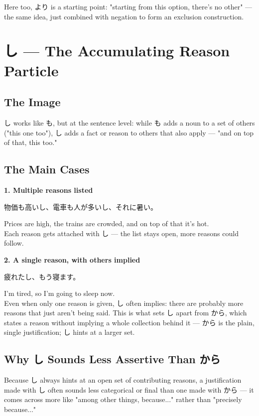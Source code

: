 \documentclass[12pt]{book}
\begin{document}
Here too, より is a starting point: "starting from this option, there's no other" — the same idea, just combined with negation to form an exclusion construction.


\chapter{し — The Accumulating Reason Particle}

\section*{The Image}

し works like も, but at the sentence level: while も adds a noun to a set of others ("this one too"), し adds a fact or reason to others that also apply — "and on top of that, this too."

\section*{The Main Cases}

\textbf{1. Multiple reasons listed}
\par\quad 物価も高いし、電車も人が多いし、それに暑い。\\
\par\quad Prices are high, the trains are crowded, and on top of that it's hot.\\

Each reason gets attached with し — the list stays open, more reasons could follow.

\textbf{2. A single reason, with others implied}
\par\quad 疲れたし、もう寝ます。\\
\par\quad I'm tired, so I'm going to sleep now.\\

Even when only one reason is given, し often implies: there are probably more reasons that just aren't being said. This is what sets し apart from から, which states a reason without implying a whole collection behind it — から is the plain, single justification; し hints at a larger set.

\section*{Why し Sounds Less Assertive Than から}

Because し always hints at an open set of contributing reasons, a justification made with し often sounds less categorical or final than one made with から — it comes across more like "among other things, because..." rather than "precisely because..."
\end{document}
